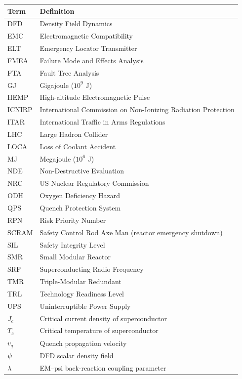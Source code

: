\documentclass[11pt,a4paper]{article}
\begin{document}
\begin{longtable}{p{0.15\tw}p{0.75\tw}}
\toprule
\textbf{Term} & \textbf{Definition} \\
\midrule
\endhead
DFD & Density Field Dynamics \\
EMC & Electromagnetic Compatibility \\
ELT & Emergency Locator Transmitter \\
FMEA & Failure Mode and Effects Analysis \\
FTA & Fault Tree Analysis \\
GJ & Gigajoule ($10^9$ J) \\
HEMP & High-altitude Electromagnetic Pulse \\
ICNIRP & International Commission on Non-Ionizing Radiation Protection \\
ITAR & International Traffic in Arms Regulations \\
LHC & Large Hadron Collider \\
LOCA & Loss of Coolant Accident \\
MJ & Megajoule ($10^6$ J) \\
NDE & Non-Destructive Evaluation \\
NRC & US Nuclear Regulatory Commission \\
ODH & Oxygen Deficiency Hazard \\
QPS & Quench Protection System \\
RPN & Risk Priority Number \\
SCRAM & Safety Control Rod Axe Man (reactor emergency shutdown) \\
SIL & Safety Integrity Level \\
SMR & Small Modular Reactor \\
SRF & Superconducting Radio Frequency \\
TMR & Triple-Modular Redundant \\
TRL & Technology Readiness Level \\
UPS & Uninterruptible Power Supply \\
$J_c$ & Critical current density of superconductor \\
$T_c$ & Critical temperature of superconductor \\
$v_q$ & Quench propagation velocity \\
$\psi$ & DFD scalar density field \\
$\lambda$ & EM--psi back-reaction coupling parameter \\
\bottomrule
\end{longtable}
\end{document}
